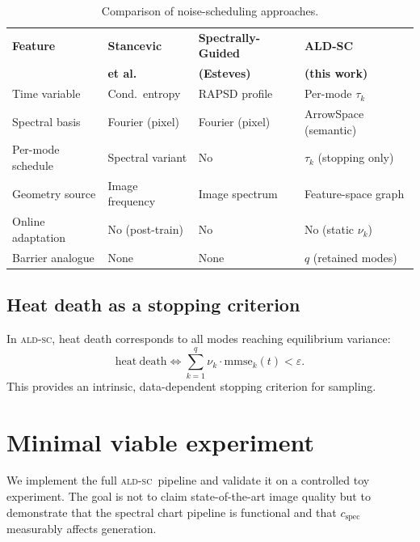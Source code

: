 \documentclass[11pt]{article}
\newcommand{\ALDSC}{\textsc{ald-sc}}
\begin{document}
    \begin{table}[ht]
    \centering
    \small
    \caption{Comparison of noise-scheduling approaches.}
    \label{tab:scheduler_comparison}
    \begin{tabular}{llll}
    \toprule
    \textbf{Feature} & \textbf{Stancevic} & \textbf{Spectrally-Guided} & \textbf{ALD-SC} \\
     & \textbf{et al.} & \textbf{(Esteves)} & \textbf{(this work)} \\
    \midrule
    Time variable & Cond.\ entropy & RAPSD profile & Per-mode $\tau_k$ \\
    Spectral basis & Fourier (pixel) & Fourier (pixel) & ArrowSpace (semantic) \\
    Per-mode schedule & Spectral variant & No & $\tau_k$ (stopping only) \\
    Geometry source & Image frequency & Image spectrum & Feature-space graph \\
    Online adaptation & No (post-train) & No & No (static $\nu_k$) \\
    Barrier analogue & None & None & $q$ (retained modes) \\
    \bottomrule
    \end{tabular}
    \end{table}

    \subsection{Heat death as a stopping criterion}
    \label{sec:heat_death_clock}
    In \ALDSC, heat death corresponds to all modes reaching
    equilibrium variance:
    \[\mathrm{heat\ death} \iff \sum_{k=1}^{q} \nu_k \cdot
    \mathrm{mmse}_k(t) < \varepsilon.\]
    This provides an intrinsic, data-dependent stopping criterion for
    sampling.

    \section{Minimal viable experiment}
    \label{sec:experiments}

    We implement the full \ALDSC~pipeline and validate it on a
    controlled toy experiment. The goal is not to claim
    state-of-the-art image quality but to demonstrate that the
    spectral chart pipeline is functional and that
    $c_{\mathrm{spec}}$ measurably affects generation.
\end{document}
